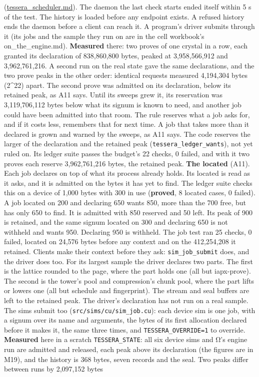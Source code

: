 \begin{description}
(\hyperref[chap:tessera-scheduler]{tessera\_\allowbreak{}scheduler.md}). The daemon the last check starts ended itself within 5 s of the test. The history is loaded before any endpoint exists. A refused history ends the daemon before a client can reach it. A program's driver submits through it (its jobs and the sample they run on are in the cell workbook's on\_\allowbreak{}the\_\allowbreak{}engine.md). \textbf{Measured} there: two proves of one crystal in a row, each granted its declaration of 838,860,800 bytes, peaked at 3,958,566,912 and 3,962,761,216. A second run on the real state gave the same declarations, and the two prove peaks in the other order: identical requests measured 4,194,304 bytes (2\textasciicircum{}22) apart. The second prove was admitted on its declaration, below its retained peak, as A11 says. Until its sweeps grew it, its reservation was 3,119,706,112 bytes below what its signum is known to need, and another job could have been admitted into that room. The rule reserves what a job asks for, and if it costs less, remembers that for next time. A job that takes more than it declared is grown and warned by the sweeps, as A11 says. The code reserves the larger of the declaration and the retained peak (\texttt{tessera\_\allowbreak{}ledger\_\allowbreak{}wants}), not yet ruled on. Its ledger suite passes the budget's 22 checks, 0 failed, and with it two proves each reserve 3,962,761,216 bytes, the retained peak. \textbf{The located} (A11). Each job declares on top of what its process already holds. Its located is read as it asks, and it is admitted on the bytes it has yet to find. The ledger suite checks this on a device of 1,000 bytes with 300 in use (\textbf{proved}, 8 located cases, 0 failed). A job located on 200 and declaring 650 wants 850, more than the 700 free, but has only 650 to find. It is admitted with 850 reserved and 50 left. Its peak of 900 is retained, and the same signum located on 300 and declaring 650 is not withheld and wants 950. Declaring 950 is withheld. The job test ran 25 checks, 0 failed, located on 24,576 bytes before any context and on the 412,254,208 it retained. Clients make their context before they ask: \texttt{sim\_\allowbreak{}job\_\allowbreak{}submit} does, and the driver does too. For its largest sample the driver declares two parts. The first is the lattice rounded to the page, where the part holds one (all but iapx-prove). The second is the tower's pool and compression's chunk pool, where the part lifts or lowers one (all but schedule and fingerprint). The stream and seal buffers are left to the retained peak. The driver's declaration has not run on a real sample. The sims submit too (\texttt{src/\allowbreak{}sims/\allowbreak{}cu/\allowbreak{}sim\_\allowbreak{}job.\allowbreak{}cu}): each device sim is one job, with a signum over its name and arguments, the bytes of its first allocation declared before it makes it, the same three times, and \texttt{TESSERA\_\allowbreak{}OVERRIDE=1} to override. \textbf{Measured} here in a scratch \texttt{TESSERA\_\allowbreak{}STATE}: all six device sims and Ω's engine run are admitted and released, each peak above its declaration (the figures are in M19), and the history is 368 bytes, seven records and the seal. Two peaks differ between runs by 2,097,152 bytes 
\end{description}
